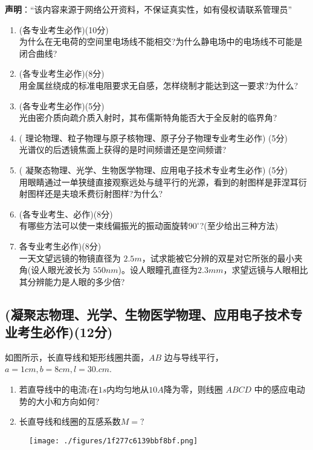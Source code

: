 
\textbf{声明}：“该内容来源于网络公开资料，不保证真实性，如有侵权请联系管理员”

\begin{enumerate}
\item (各专业考生必作)(10分)\\
为什么在无电荷的空间里电场线不能相交?为什么静电场中的电场线不可能是闭合曲线?
\item (各专业考生必作)(8分)\\
用金属丝绕成的标准电阻要求无自感，怎样绕制才能达到这一要求?为什么?
\item (各专业考生必作)(5分)\\
光由密介质向疏介质入射时，其布儒斯特角能否大于全反射的临界角?
\item ( 理论物理、粒子物理与原子核物理、原子分子物理专业考生必作)
(5分)\\
光谱仪的后透镜焦面上获得的是时间频谱还是空间频谱?
\item ( 凝聚态物理、光学、生物医学物理、应用电子技术专业考生必作)
(5分)\\
用眼睛通过一单狭缝直接观察远处与缝平行的光源，看到的射图样是菲涅耳衍射图样还是夫琅禾费衍射图样?为什么?
\item (各专业考生、必作)(8分)\\
有哪些方法可以使一束线偏振光的振动面旋转$90^\circ$?(至少给出三种方法)
\item 各专业考生必作)(8分)\\
一天文望远镜的物镜直径为 $2.5m$，试求能被它分辨的双星对它所张的最小夹角(设人眼光波长为 $550nm$)。设人眼瞳孔直径为$2.3mm$，求望远镜与人眼相比其分辨能力是人眼的多少倍?
\end{enumerate}
\subsection{(凝聚志物理、光学、生物医学物理、应用电子技术专业考生必作)(12分)}
如图所示，长直导线和矩形线圈共面，$AB$ 边与导线平行，$a=1cm,b=8cm,l=30.cm$.
\begin{enumerate}
\item 若直导线中的电流$i$在$1s$内均匀地从$10A$降为零，则线圈 $ABCD$ 中的感应电动势的大小和方向如何?
\item 长直导线和线圈的互感系数$M=?$
\end{enumerate}
\begin{figure}[ht]
\centering
\texttt{[image: ./figures/1f277c6139bbf8bf.png]}
\caption{} \label{fig_CD07_1}
\end{figure}
